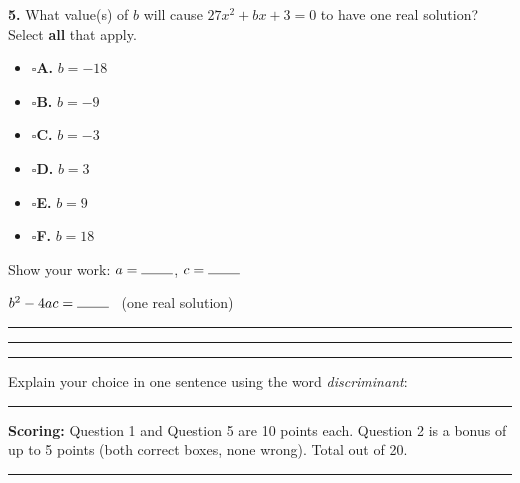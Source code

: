 \documentclass[11pt]{article}
\newcommand{\checkbox}{$\square$\;}
\begin{document}
\vspace{6pt}
\begin{minipage}[t]{0.50\textwidth}
\textbf{5.} What value(s) of $b$ will cause $27x^2+bx+3=0$ to have one real solution? Select \textbf{all} that apply.

\vspace{4pt}
\begin{itemize}[leftmargin=1.2em, itemsep=5pt]
\item[] \checkbox \textbf{A.} $b=-18$
\item[] \checkbox \textbf{B.} $b=-9$
\item[] \checkbox \textbf{C.} $b=-3$
\item[] \checkbox \textbf{D.} $b=3$
\item[] \checkbox \textbf{E.} $b=9$
\item[] \checkbox \textbf{F.} $b=18$
\end{itemize}
\end{minipage}\hfill
\begin{minipage}[t]{0.46\textwidth}
Show your work: $a=\rule{0.8cm}{0.4pt}$, $c=\rule{0.8cm}{0.4pt}$

\vspace{6pt}
$b^2-4ac=\rule{0.8cm}{0.4pt}$ \ (one real solution)

\vspace{14pt}\rule{\linewidth}{0.4pt}

\vspace{14pt}\rule{\linewidth}{0.4pt}

\vspace{14pt}\rule{\linewidth}{0.4pt}

\vspace{8pt}
Explain your choice in one sentence using the word \emph{discriminant}:

\vspace{14pt}\rule{\linewidth}{0.4pt}
\end{minipage}

\vfill
\noindent\textbf{Scoring:} Question 1 and Question 5 are 10 points each. Question 2 is a bonus of up to 5 points (both correct boxes, none wrong). Total out of 20.

\newpage
{}

\vspace{4pt}\noindent\rule{\textwidth}{0.6pt}
\end{document}

